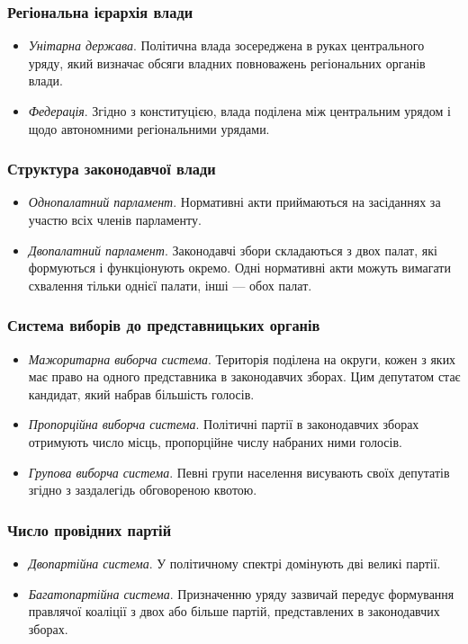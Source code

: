 \subsubsection{Регіональна ієрархія влади}
\begin{itemize}
\item \textit{Унітарна держава}. Політична влада зосереджена в руках центрального уряду, який визначає обсяги владних повноважень регіональних органів влади.
\item \textit{Федерація}. Згідно з конституцією, влада поділена між центральним урядом і щодо автономними регіональними урядами.
\end{itemize}
\subsubsection{Структура законодавчої влади}
\begin{itemize}
\item \textit{Однопалатний парламент}. Нормативні акти приймаються на засіданнях за участю всіх членів парламенту.
\item \textit{Двопалатний парламент}. Законодавчі збори складаються з двох палат, які формуються і функціонують окремо. Одні нормативні акти можуть вимагати схвалення тільки однієї палати, інші — обох палат.
\end{itemize}
\subsubsection{Система виборів до представницьких органів}
\begin{itemize}
\item \textit{Мажоритарна виборча система}. Територія поділена на округи, кожен з яких має право на одного представника в законодавчих зборах. Цим депутатом стає кандидат, який набрав більшість голосів.
\item \textit{Пропорційна виборча система}. Політичні партії в законодавчих зборах отримують число місць, пропорційне числу набраних ними голосів.
\item \textit{Групова виборча система}. Певні групи населення висувають своїх депутатів згідно з заздалегідь обговореною квотою.
\end{itemize}
\subsubsection{Число провідних партій}
\begin{itemize}
\item \textit{Двопартійна система}. У політичному спектрі домінують дві великі партії.
\item \textit{Багатопартійна система}. Призначенню уряду зазвичай передує формування правлячої коаліції з двох або більше партій, представлених в законодавчих зборах.
\end{itemize}
